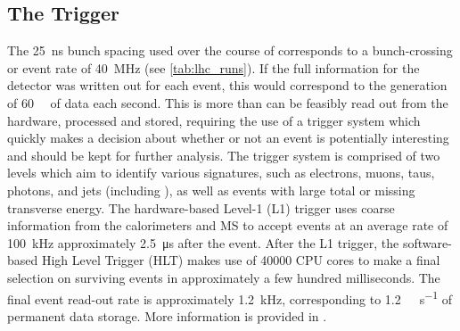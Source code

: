 \subsection{The Trigger}\label{sec:trigger}
The \SI{25}{\nano\second} bunch spacing used over the course of \runtwo corresponds to a bunch-crossing or event rate of \SI{40}{\mega\hertz} (see \cref{tab:lhc_runs}).
If the full information for the detector was written out for each event, this would correspond to the generation of \SI{60}{\tera\byte} of data each second.
This is more than can be feasibly read out from the hardware, processed and stored, requiring the use of a trigger system which quickly makes a decision about whether or not an event is potentially interesting and should be kept for further analysis.
The trigger system is comprised of two levels which aim to identify various signatures, such as electrons, muons, taus, photons, and jets (including \bjets), as well as events with large total or missing transverse energy.
The hardware-based Level-1 (L1) trigger uses coarse information from the calorimeters and MS to accept events at an average rate of \SI{100}{\kilo\hertz} approximately \SI{2.5}{\micro\second} after the event.
After the L1 trigger, the software-based High Level Trigger (HLT) makes use of \num{40000} CPU cores to make a final selection on surviving events in approximately a few hundred milliseconds. 
The final event read-out rate is approximately \SI{1.2}{\kilo\hertz}, corresponding to \SI{1.2}{\giga\byte\per\second} of permanent data storage.
More information is provided in \cite{TRIG-2016-01}.


